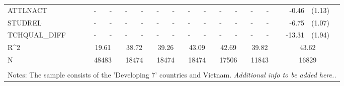 \documentclass[10pt]{article}
\begin{document}
\begin{table}[htbp]
\begin{tabular}{lrlrlrlrlrlrlrl}
 ATTLNACT & \multicolumn{1}{c}{-} & \multicolumn{1}{c}{-} & \multicolumn{1}{c}{-} & \multicolumn{1}{c}{-} & \multicolumn{1}{c}{-} & \multicolumn{1}{c}{-} & \multicolumn{1}{c}{-} & \multicolumn{1}{c}{-} & \multicolumn{1}{c}{-} & \multicolumn{1}{c}{-} & \multicolumn{1}{c}{-} & \multicolumn{1}{c}{-} & -0.46 & (1.13) \\[0.2em]
 STUDREL & \multicolumn{1}{c}{-} & \multicolumn{1}{c}{-} & \multicolumn{1}{c}{-} & \multicolumn{1}{c}{-} & \multicolumn{1}{c}{-} & \multicolumn{1}{c}{-} & \multicolumn{1}{c}{-} & \multicolumn{1}{c}{-} & \multicolumn{1}{c}{-} & \multicolumn{1}{c}{-} & \multicolumn{1}{c}{-} & \multicolumn{1}{c}{-} & -6.75 & (1.07) \\[0.2em]
 TCHQUAL\_DIFF & \multicolumn{1}{c}{-} & \multicolumn{1}{c}{-} & \multicolumn{1}{c}{-} & \multicolumn{1}{c}{-} & \multicolumn{1}{c}{-} & \multicolumn{1}{c}{-} & \multicolumn{1}{c}{-} & \multicolumn{1}{c}{-} & \multicolumn{1}{c}{-} & \multicolumn{1}{c}{-} & \multicolumn{1}{c}{-} & \multicolumn{1}{c}{-} & -13.31 & (1.94) \\[0.2em]
   
     R^{2} & \multicolumn{2}{c}{19.61} & \multicolumn{2}{c}{38.72} & \multicolumn{2}{c}{39.26} & \multicolumn{2}{c}{43.09} & \multicolumn{2}{c}{42.69} & \multicolumn{2}{c}{39.82} & \multicolumn{2}{c}{43.62} \\
    N     & \multicolumn{2}{c}{48483} & \multicolumn{2}{c}{18474} & \multicolumn{2}{c}{18474} & \multicolumn{2}{c}{18474} & \multicolumn{2}{c}{17506} & \multicolumn{2}{c}{11843} & \multicolumn{2}{c}{16829} \\
    
    \bottomrule
    
        \\
        \multicolumn{15}{l}{Notes: The sample consists of the 'Developing 7' countries and Vietnam. \textit{Additional info to be added here..}}\\
\end{tabular}%
\label{tab:addlabel}%
\end{table}%
\end{document}
